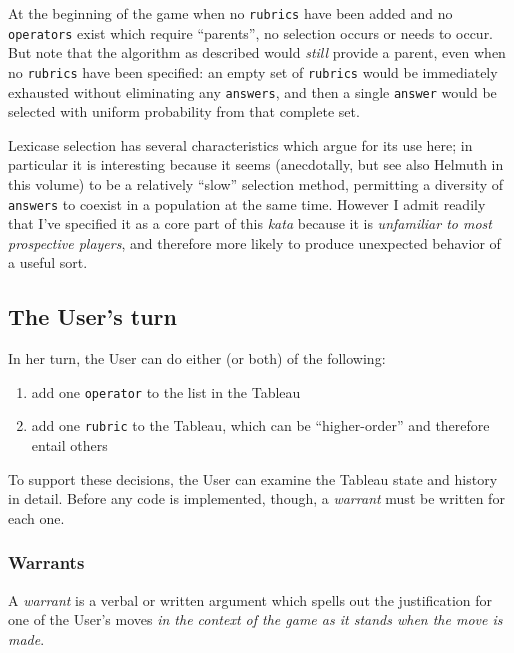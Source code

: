 At the beginning of the game when no \texttt{rubrics} have been added and no \texttt{operators} exist which require ``parents'', no selection occurs or needs to occur. But note that the algorithm as described would \emph{still} provide a parent, even when no \texttt{rubrics} have been specified: an empty set of \texttt{rubrics} would be immediately exhausted without eliminating any \texttt{answers}, and then a single \texttt{answer} would be selected with uniform probability from that complete set.

Lexicase selection has several characteristics which argue for its use here; in particular it is interesting because it seems (anecdotally, but see also Helmuth in this volume) to be a relatively ``slow'' selection method, permitting a diversity of \texttt{answers} to coexist in a population at the same time. However I admit readily that I've specified it as a core part of this \emph{kata} because it is \emph{unfamiliar to most prospective players}, and therefore more likely to produce unexpected behavior of a useful sort.

\subsection{The User's turn}\hypertarget{the-users-turn}{}\label{the-users-turn}

In her turn, the User can do either (or both) of the following:

\begin{enumerate}
\item add one \texttt{operator} to the list in the Tableau
\item add one \texttt{rubric} to the Tableau, which can be ``higher-order'' and therefore entail others
\end{enumerate}

To support these decisions, the User can examine the Tableau state and history in detail. Before any code is implemented, though, a \emph{warrant} must be written for each one.

\subsubsection{Warrants}\hypertarget{warrants}{}\label{warrants}

A \emph{warrant} is a verbal or written argument which spells out the justification for one of the User's moves \emph{in the context of the game as it stands when the move is made}.

